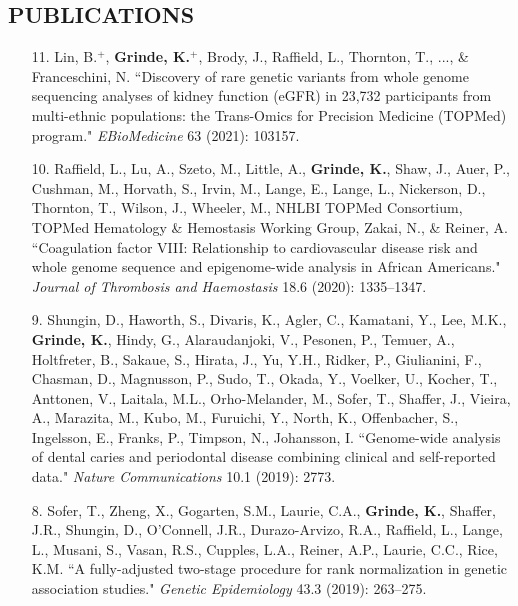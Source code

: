 \documentclass[margin]{res}
\begin{document}
\begin{resume}
										
\section{PUBLICATIONS} 

\begin{itemize}

\item[11.] Lin, B.$^{+}$, \textbf{Grinde, K.}$^{+}$, Brody, J., Raffield, L., Thornton, T., ..., \& Franceschini, N. ``Discovery of rare genetic variants from whole genome sequencing analyses  of kidney function (eGFR) in 23,732 participants from multi-ethnic populations: the Trans-Omics for Precision Medicine (TOPMed) program." \textit{EBioMedicine} 63 (2021): 103157.

\item[10.] Raffield, L., Lu, A., Szeto, M., Little, A., \textbf{Grinde, K.},  Shaw, J., Auer, P., Cushman, M., Horvath, S., Irvin, M., Lange, E., Lange, L., Nickerson, D., Thornton, T., Wilson, J., Wheeler, M., NHLBI TOPMed Consortium, TOPMed Hematology \& Hemostasis Working Group, Zakai, N., \& Reiner, A. ``Coagulation factor VIII: Relationship to cardiovascular disease risk and whole genome sequence and epigenome-wide analysis in African Americans." \textit{Journal of Thrombosis and Haemostasis} 18.6 (2020): 1335--1347.

\item[9.] Shungin, D., Haworth, S., Divaris, K., Agler, C., Kamatani, Y., Lee, M.K., \textbf{Grinde, K.}, Hindy, G., Alaraudanjoki, V., Pesonen, P., Temuer, A., Holtfreter, B., Sakaue, S., Hirata, J., Yu, Y.H., Ridker, P., Giulianini, F., Chasman, D., Magnusson, P., Sudo, T., Okada, Y., Voelker, U., Kocher, T., Anttonen, V., Laitala, M.L., Orho-Melander, M., Sofer, T., Shaffer, J., Vieira, A., Marazita, M., Kubo, M., Furuichi, Y., North, K., Offenbacher, S., Ingelsson, E., Franks, P., Timpson, N., Johansson, I. ``Genome-wide analysis of dental caries and periodontal disease combining clinical and self-reported data." \textit{Nature Communications} 10.1 (2019): 2773.

\item[8.] Sofer, T., Zheng, X., Gogarten, S.M., Laurie, C.A., \textbf{Grinde, K.}, Shaffer, J.R., Shungin, D., O'Connell, J.R., Durazo-Arvizo, R.A., Raffield, L., Lange, L., Musani, S., Vasan, R.S., Cupples, L.A., Reiner, A.P., Laurie, C.C., Rice, K.M. ``A fully-adjusted two-stage procedure for rank normalization in genetic association studies." \textit{Genetic Epidemiology} 43.3 (2019): 263--275.


\end{itemize}
\end{resume}
\end{document}
